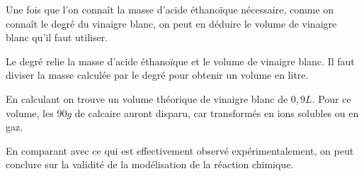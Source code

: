 %
\begin{coupDePouce}
  Une fois que l'on connaît la masse d'acide éthanoïque nécessaire, comme on connaît le degré du vinaigre blanc, on peut en déduire le volume de vinaigre blanc qu'il faut utiliser.
  
  Le degré relie la masse d'acide éthanoïque et le volume de vinaigre blanc.
  Il faut diviser la masse calculée par le degré pour obtenir un volume en litre.
\end{coupDePouce}

%
\begin{coupDePouce}
  En calculant on trouve un volume théorique de vinaigre blanc de $0,\!9 \unit{L}$.
  Pour ce volume, les $90 \unit{g}$ de calcaire auront disparu, car transformés en ions solubles ou en gaz.
  
  En comparant avec ce qui est effectivement observé expérimentalement, on peut conclure sur la validité de la modélisation de la réaction chimique.
\end{coupDePouce}